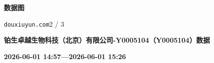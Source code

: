 \documentclass[UTF8,10pt,a4paper,fontset=fandol]{ctexart}
\begin{document}
\vfill

\begin{center}
\textbf{数据图}

\end{center}

\vfill

\noindent\texttt{douxiuyun.com}\hfill 2 / 3

\newpage

\begin{center}
\textbf{铂生卓越生物科技（北京）有限公司-Y0005104（Y0005104）数据}

\textbf{2026-06-01 14:57\hspace{2em}---\hspace{2em}2026-06-01 15:26}
\end{center}
\end{document}
